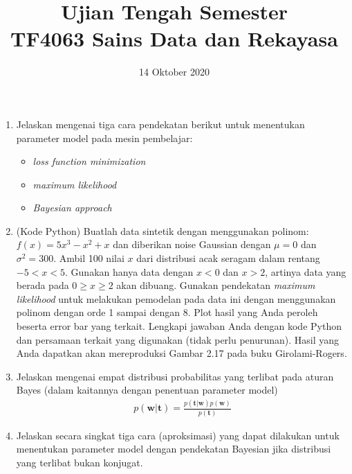 \documentclass[a4paper,11pt]{article} %
\begin{document}
\title{Ujian Tengah Semester \\
TF4063 Sains Data dan Rekayasa}
\author{}
\date{14 Oktober 2020}
\maketitle

\begin{enumerate}
%
\item Jelaskan mengenai tiga cara pendekatan berikut untuk menentukan parameter model
pada mesin pembelajar:
  \begin{itemize}
  \item \textit{loss function minimization}
  \item \textit{maximum likelihood}
  \item \textit{Bayesian approach}
  \end{itemize}
%
\item (Kode Python) Buatlah data sintetik dengan menggunakan polinom: $f(x)=5x^3 - x^2 + x$ dan
diberikan noise Gaussian dengan $\mu=0$ dan $\sigma^2=300$. Ambil 100 nilai $x$
dari distribusi acak seragam dalam rentang $-5 < x < 5$. Gunakan hanya data dengan
$x < 0$ dan $x > 2$, artinya data yang berada pada $0 \geq x \geq 2$ akan dibuang.
Gunakan pendekatan \textit{maximum likelihood} untuk melakukan pemodelan pada data
ini dengan menggunakan polinom dengan orde 1 sampai dengan 8. Plot hasil yang Anda
peroleh beserta error bar yang terkait. Lengkapi jawaban Anda dengan kode Python
dan persamaan terkait yang digunakan (tidak perlu penurunan). Hasil yang Anda dapatkan
akan mereproduksi Gambar 2.17 pada buku Girolami-Rogers.
%
\item Jelaskan mengenai empat distribusi probabilitas yang terlibat
pada aturan Bayes (dalam kaitannya
dengan penentuan parameter model)
\begin{align}
p(\mathbf{w} | \mathbf{t}) = 
\frac{p(\mathbf{t}|\mathbf{w}) p(\mathbf{w})}{p(\mathbf{t})}
\end{align}
%
\item Jelaskan secara singkat tiga cara (aproksimasi) yang dapat dilakukan
untuk menentukan parameter model dengan pendekatan Bayesian jika distribusi
yang terlibat bukan konjugat.
%
\end{enumerate}
\end{document}
